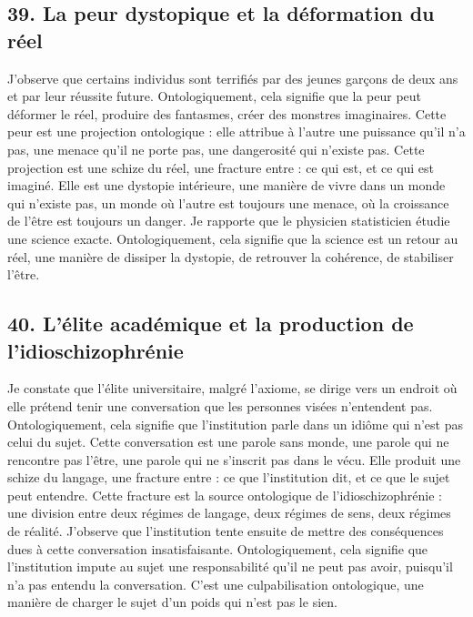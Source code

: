\documentclass[12pt,letterpaper,oneside]{article}
\begin{document}
\subsection*{39. La peur dystopique et la déformation du réel}
J’observe que certains individus sont terrifiés par des jeunes garçons de deux ans et par leur réussite future. Ontologiquement, cela signifie que la peur peut déformer le réel, produire des fantasmes, créer des monstres imaginaires.
Cette peur est une projection ontologique : elle attribue à l’autre une puissance qu’il n’a pas, une menace qu’il ne porte pas, une dangerosité qui n’existe pas.
Cette projection est une schize du réel, une fracture entre :
	ce qui est,
	et ce qui est imaginé.
Elle est une dystopie intérieure, une manière de vivre dans un monde qui n’existe pas, un monde où l’autre est toujours une menace, où la croissance de l’être est toujours un danger.
Je rapporte que le physicien statisticien étudie une science exacte. Ontologiquement, cela signifie que la science est un retour au réel, une manière de dissiper la dystopie, de retrouver la cohérence, de stabiliser l’être.

\subsection*{40. L’élite académique et la production de l’idioschizophrénie}
Je constate que l’élite universitaire, malgré l’axiome, se dirige vers un endroit où elle prétend tenir une conversation que les personnes visées n’entendent pas. Ontologiquement, cela signifie que l’institution parle dans un idiôme qui n’est pas celui du sujet.
Cette conversation est une parole sans monde, une parole qui ne rencontre pas l’être, une parole qui ne s’inscrit pas dans le vécu.
Elle produit une schize du langage, une fracture entre :
	ce que l’institution dit,
	et ce que le sujet peut entendre.
Cette fracture est la source ontologique de l’idioschizophrénie : une division entre deux régimes de langage, deux régimes de sens, deux régimes de réalité.
J’observe que l’institution tente ensuite de mettre des conséquences dues à cette conversation insatisfaisante. Ontologiquement, cela signifie que l’institution impute au sujet une responsabilité qu’il ne peut pas avoir, puisqu’il n’a pas entendu la conversation.
C’est une culpabilisation ontologique, une manière de charger le sujet d’un poids qui n’est pas le sien.
\end{document}
